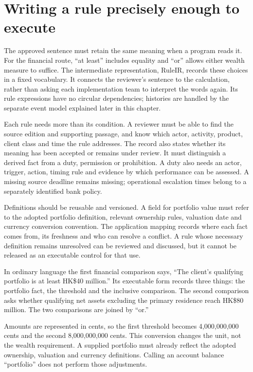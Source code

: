 \section{Writing a rule precisely enough to execute}
\label{merge:P-03-product:02}


The approved sentence must retain the same meaning when a program reads it.
For the financial route, ``at least'' includes equality and ``or'' allows either
wealth measure to suffice. The intermediate representation, RuleIR, records these
choices in a fixed vocabulary. It connects the reviewer's sentence to the
calculation, rather than asking each implementation team to interpret the words
again. Its rule expressions have no circular dependencies; histories are handled
by the separate event model explained later in this chapter.

Each rule needs more than its condition. A reviewer must be able to find the
source edition and supporting passage, and know which actor, activity, product,
client class and time the rule addresses. The record also states whether its
meaning has been accepted or remains under review. It must distinguish a derived fact from
a duty, permission or prohibition. A duty also needs an actor, trigger, action,
timing rule and evidence by which performance can be assessed. A missing source
deadline remains missing; operational escalation times belong to a separately
identified bank policy.


Definitions should be reusable and versioned. A field for portfolio value must
refer to the adopted portfolio definition, relevant ownership rules, valuation
date and currency conversion convention. The application mapping records where
each fact comes from, its freshness and who can resolve a conflict. A rule whose
necessary definition remains unresolved can be reviewed and discussed, but it
cannot be released as an executable control for that use.

In ordinary language the first financial comparison says, ``The client's
qualifying portfolio is at least HK\$40 million.'' Its executable form records
three things: the portfolio fact, the threshold and the inclusive comparison.
The second comparison asks whether qualifying net assets excluding the primary
residence reach HK\$80 million. The two comparisons are joined by ``or.''

Amounts are represented in cents, so the first threshold becomes
4,000,000,000 cents and the second 8,000,000,000 cents. This conversion changes
the unit, not the wealth requirement. A supplied portfolio must already reflect
the adopted ownership, valuation and currency definitions. Calling an account
balance ``portfolio'' does not perform those adjustments.

